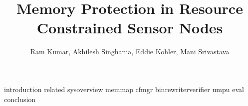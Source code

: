 \documentclass[acmtocl,acmnow]{acmtrans2m}
\title{Memory Protection in Resource Constrained Sensor Nodes}
\author{Ram Kumar, Akhilesh Singhania, Eddie Kohler, Mani Srivastava}
\begin{document}
            
            
\maketitle


 {introduction}
 {related}
 {sysoverview}
 {memmap}
 {cfmgr}
 {binrewriterverifier}
 {umpu}
 {eval}
 {conclusion}






\end{document}
